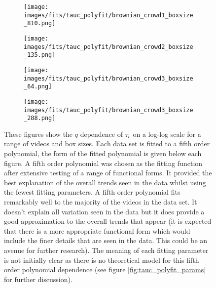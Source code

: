 \documentclass[10pt]{article}
\begin{document}
\begin{figure}[H]
\begin{subfigure}[t]{.5\textwidth}
  \centering
 \texttt{[image: images/fits/tauc\_polyfit/brownian\_crowd1\_boxsize\_810.png]}
  \caption{}
\end{subfigure}%
\hfill
\begin{subfigure}[t]{.5\textwidth}
  \centering
  \texttt{[image: images/fits/tauc\_polyfit/brownian\_crowd2\_boxsize\_135.png]}
  \caption{}
\end{subfigure}
\par\bigskip
\begin{subfigure}[t]{.5\textwidth}
  \centering
 \texttt{[image: images/fits/tauc\_polyfit/brownian\_crowd3\_boxsize\_64.png]}
  \caption{}
\end{subfigure}%
\hfill
\begin{subfigure}[t]{.5\textwidth}
  \centering
  \texttt{[image: images/fits/tauc\_polyfit/brownian\_crowd3\_boxsize\_288.png]}
  \caption{}
\end{subfigure}
\caption{These figures show the $q$ dependence of $\tau_c$ on a log-log scale for a range of videos and box sizes. Each data set is fitted to a fifth order polynomial, the form of the fitted polynomial is given below each figure. A fifth order polynomial was chosen as the fitting function after extensive testing of a range of functional forms. It provided the best explanation of the overall trends seen in the data whilst using the fewest fitting parameters. A fifth order polynomial fits remarkably well to the majority of the videos in the data set. It doesn't explain all variation seen in the data but it does provide a good approximation to the overall trends that appear (it is expected that there is a more appropriate functional form which would include the finer details that are seen in the data. This could be an avenue for further research). The meaning of each fitting parameter is not initially clear as there is no theoretical model for this fifth order polynomial dependence (see figure \ref{fig:tauc_polyfit_params} for further discussion).}
\label{fig:tauc_polyfit1}
\end{figure}
\end{document}
